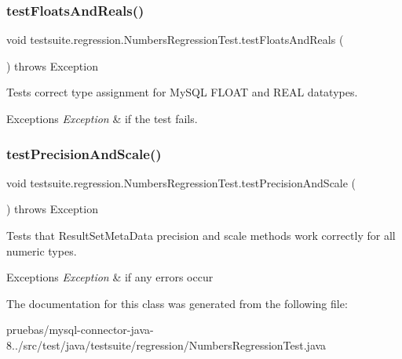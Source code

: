 \subsubsection{\texorpdfstring{test\+Floats\+And\+Reals()}{testFloatsAndReals()}}
{\footnotesize\ttfamily void testsuite.\+regression.\+Numbers\+Regression\+Test.\+test\+Floats\+And\+Reals (\begin{DoxyParamCaption}{ }\end{DoxyParamCaption}) throws Exception}

Tests correct type assignment for My\+S\+QL F\+L\+O\+AT and R\+E\+AL datatypes.


\begin{DoxyExceptions}{Exceptions}
{\em Exception} & if the test fails. \\
\hline
\end{DoxyExceptions}
\mbox{\label{classtestsuite_1_1regression_1_1_numbers_regression_test_aad8beaba829a493efd49381a817144b9}} 
\subsubsection{\texorpdfstring{test\+Precision\+And\+Scale()}{testPrecisionAndScale()}}
{\footnotesize\ttfamily void testsuite.\+regression.\+Numbers\+Regression\+Test.\+test\+Precision\+And\+Scale (\begin{DoxyParamCaption}{ }\end{DoxyParamCaption}) throws Exception}

Tests that Result\+Set\+Meta\+Data precision and scale methods work correctly for all numeric types.


\begin{DoxyExceptions}{Exceptions}
{\em Exception} & if any errors occur \\
\hline
\end{DoxyExceptions}


The documentation for this class was generated from the following file\+:\begin{DoxyCompactItemize}
\item 
pruebas/mysql-\/connector-\/java-\/8../src/test/java/testsuite/regression/Numbers\+Regression\+Test.\+java\end{DoxyCompactItemize}
